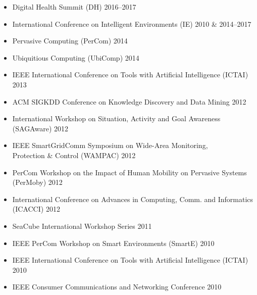\begin{itemize}
	\item{Digital Health Summit (DH) \hfill 2016--2017}
	\item{International Conference on Intelligent Environments (IE) \hfill 2010 \& 2014--2017}
	\item{Pervasive Computing (PerCom) \hfill 2014}
	\item{Ubiquitious Computing (UbiComp) \hfill 2014}
	\item{IEEE International Conference on Tools with Artificial Intelligence (ICTAI) \hfill 2013}
	\item{ACM SIGKDD Conference on Knowledge Discovery and Data Mining \hfill 2012}
  \item{International Workshop on Situation, Activity and Goal Awareness (SAGAware) \hfill 2012}
  \item{IEEE SmartGridComm Symposium on Wide-Area Monitoring, \\ \indent Protection \& Control (WAMPAC) \hfill 2012}
	\item{PerCom Workshop on the Impact of Human Mobility on Pervasive Systems (PerMoby) \hfill 2012}
	\item{International Conference on Advances in Computing, Comm. and Informatics (ICACCI) \hfill 2012}
	\item{SeaCube International Workshop Series  \hfill 2011}
	\item{IEEE PerCom Workshop on Smart Environments (SmartE) \hfill 2010}
	\item{IEEE International Conference on Tools with Artificial Intelligence (ICTAI) \hfill 2010}
	\item{IEEE Consumer Communications and Networking Conference \hfill 2010} 
\end{itemize}
